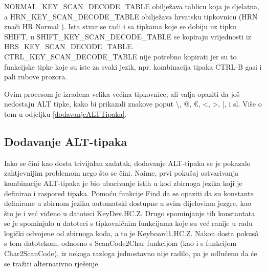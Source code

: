 \documentclass{foi}
\begin{document}
{\selectfont NORMAL\_KEY\_SCAN\_DECODE\_TABLE } obilježava tablicu koja je djelatna, a {\selectfont HRN\_KE\-Y\_SCAN\_DECODE\_TABLE } obilježava hrvatsku tipkovnicu ({\selectfont HRN} znači {\selectfont HR Normal} ). Ista stvar se radi i sa tipkama koje se dobiju uz tipku {\selectfont SHIFT}, u {\selectfont SHIFT\_KEY\_SCAN\_DECODE\_TABLE} se kopiraju vrijednosti iz {\selectfont HRS\_KEY\_SCAN\_DECODE\_TABLE}. {\selectfont CTRL\_KEY\_SCAN\_DECODE\_TABLE} n\-ije potrebno kopirati jer su to funkcijske tipke koje su iste za svaki jezik, npr. kombinacija tipaka {\selectfont CTRL-B} gasi i pali rubove prozora.

Ovim procesom je izrađena velika većina tipkovnice, ali valja opaziti da još nedostaju {\selectfont ALT} tipke, kako bi prikazali znakove poput {\selectfont \textbackslash}, {\selectfont @}, {\selectfont €}, {\selectfont <}, {\selectfont >}, {\selectfont |}, i sl. Više o tom u odjeljku \ref{dodavanjeALTTipaka}.

\subsection{Dodavanje {\selectfont ALT}-tipaka \label{dodavanjeALTTipaka}}

Iako se čini kao dosta trivijalan zadatak, dodavanje {\selectfont ALT}-tipaka se je pokazalo zahtjevnijim problemom nego što se čini. Naime, prvi pokušaj ostvarivanja kombinacije {\selectfont ALT}-tipaka je bio ubacivanje istih u kod zbirnoga jezika koji je definirao i raspored tipaka. Pomoću funkcije {\selectfont Find} da se opaziti da su konstante definirane u zbirnom jeziku automatski dostupne u svim dijelovima jezgre, kao što je i već viđeno u datoteci {\selectfont KeyDev.HC.Z}. Drugo spominjanje tih konstantata se je spominjalo u datoteci s tipkovničnim funkcijama koje su već ranije u radu logički odvojene od zbirnoga koda, a to je {\selectfont Keyboard1.HC.Z}. Nakon dosta pokusâ s tom datotekom, odnosno s {\selectfont ScanCode2Char } funkcijom (kao i s funkcijom {\selectfont Char2ScanCode}), iz nekoga razloga jednostavno nije radilo, pa je odlučeno da će se tražiti alternativno rješenje.
\end{document}
